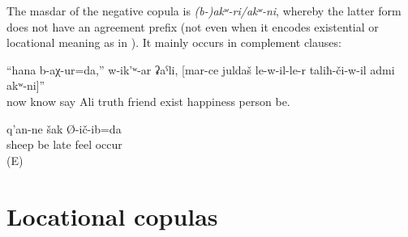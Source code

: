 The masdar of the negative copula is \textit{{(b-)akʷ-ri\slash akʷ-ni}}, whereby the latter form does not have an agreement prefix (not even when it encodes existential or locational meaning as in ). It mainly occurs in complement clauses:
%
\begin{exe}
	\ex	\label{ex:Now I know, says Ali, that there is no happy man than the one who has a true friend}
	\gll	``hana	b-aχ-ur=da,''	w-ik'ʷ-ar	ʡaˁli,	[mar-ce	juldaš	le-w-il-le-r	taliħ-či-w-il	admi	akʷ-ni]''\\
		now	know	say	Ali	truth	friend	exist	happiness	person	be.\\
	\glt	{}

	\ex	\label{ex:I guessed late that my sheep were not there}
		q'an-ne	šak	Ø-ič-ib=da\\
			sheep	be	late	feel	occur\\
	\glt	{} (E)
\end{exe}



\section{Locational copulas}
\label{sec:Locational copulae}

